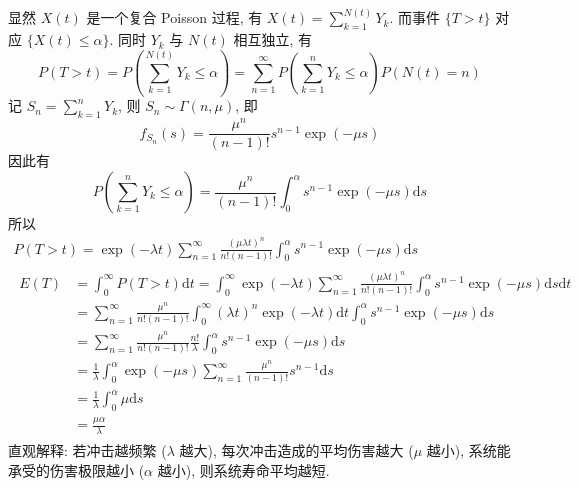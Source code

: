 \documentclass[boxes]{homework}
\begin{document}
\begin{solution}
    显然 $X(t)$ 是一个复合 Poisson 过程, 有 $\displaystyle X(t) = \sum_{k = 1}^{N(t)}Y_k$. 而事件 $\{T>t\}$ 对应 $\{X(t)\leq\alpha\}$. 同时 $Y_k$ 与 $N(t)$ 相互独立, 有
    \begin{equation}
        P(T>t)=P\left(\sum_{k = 1}^{N(t)}Y_k\leq\alpha\right)=\sum_{n=1}^\infty P\left(\sum_{k = 1}^{n}Y_k\leq\alpha\right)P(N(t)=n)
    \end{equation}
    记 $S_n=\displaystyle\sum_{k = 1}^{n}Y_k$, 则 $S_n\sim \Gamma(n,\mu)$, 即
    \begin{equation}
        f_{S_n}(s) = \frac{\mu^n}{(n-1)!}s^{n-1}\exp(-\mu s)
    \end{equation}
    因此有
    \begin{equation}
        P\left(\sum_{k = 1}^{n}Y_k\leq\alpha\right) = \frac{\mu^n}{(n-1)!}\int_0^\alpha s^{n-1}\exp(-\mu s)\mathrm{d}s
    \end{equation}
    所以
    \begin{gather}
        P(T>t) = \exp(-\lambda t)\sum_{n = 1}^\infty \frac{(\mu\lambda t)^n}{n!(n-1)!}\int_0^\alpha s^{n-1}\exp(-\mu s)\mathrm{d}s\\
        \begin{aligned}
            E(T) &= \int_0^\infty P(T>t)\mathrm{d}t
            = \int_0^\infty \exp(-\lambda t)\sum_{n = 1}^\infty \frac{(\mu\lambda t)^n}{n!(n-1)!}\int_0^\alpha s^{n-1}\exp(-\mu s)\mathrm{d}s\mathrm{d}t\\
            &= \sum_{n = 1}^\infty \frac{\mu^n}{n!(n-1)!}\int_0^\infty (\lambda t)^n\exp(-\lambda t)\mathrm{d}t\int_0^\alpha s^{n-1}\exp(-\mu s)\mathrm{d}s\\
            &= \sum_{n=1}^\infty\frac{\mu^n}{n!(n-1)!}\frac{n!}{\lambda}\int_0^\alpha s^{n-1}\exp(-\mu s)\mathrm{d}s\\
            &= \frac{1}{\lambda}\int_0^\alpha\exp(-\mu s)\sum_{n=1}^\infty\frac{\mu^n}{(n-1)!}s^{n-1}\mathrm{d}s\\
            &= \frac{1}{\lambda}\int_0^\alpha \mu\mathrm{d}s\\
            &= \frac{\mu\alpha}{\lambda}
        \end{aligned}
    \end{gather}
    直观解释: 若冲击越频繁 ($\lambda$ 越大), 每次冲击造成的平均伤害越大 ($\mu$ 越小), 系统能承受的伤害极限越小 ($\alpha$ 越小), 则系统寿命平均越短.
\end{solution}
\end{document}

